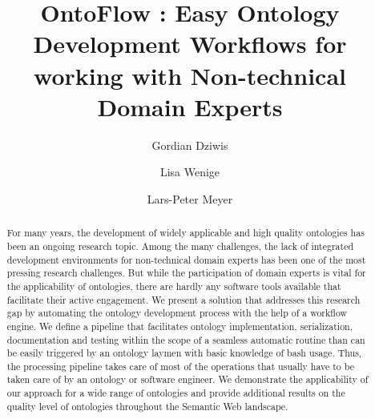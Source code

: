 \documentclass[sigconf]{acmart}
\begin{document}
\title{OntoFlow : Easy Ontology Development Workflows for working with Non-technical Domain Experts}

\author{Gordian Dziwis}
\authornote{}
\author{Lisa Wenige}
\authornotemark[1]
\author{Lars-Peter Meyer}
\authornotemark[1]

\renewcommand{\shortauthors}{Dziwis and Wenige et al.}

\begin{abstract}
  For many years, the development of widely applicable and high quality ontologies has been an ongoing research topic. Among the many challenges, the lack of integrated development environments for non-technical domain experts has been one of the most pressing research challenges. But while the participation of domain experts is vital for the applicability of ontologies, there are hardly any software tools available that facilitate their active engagement. We present a solution that addresses this research gap by automating the ontology development process with the help of a workflow engine. We define a pipeline that facilitates ontology implementation, serialization, documentation and testing within the scope of a seamless automatic routine than can be easily triggered by an ontology laymen with basic knowledge of bash usage. Thus, the processing pipeline takes care of most of the operations that usually have to be taken care of by an ontology or software engineer. We demonstrate the applicability of our approach for a wide range of ontologies and provide additional results on the quality level of ontologies throughout the Semantic Web landscape.
\end{abstract}
\end{document}
